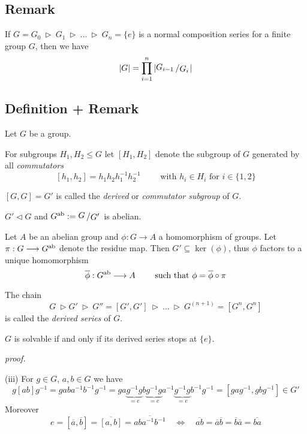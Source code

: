 \documentclass[12pt]{book}
\newcommand{\slant}[2]{{\raisebox{.1em}{$#1$}\left/\raisebox{-.1em}{$#2$}\right.}}
\begin{document}
\begin{spacing}{1.3}
\subsection{Remark} %
If $G=G_0 \ \triangleright \ G_1 \ \triangleright \ \ldots \ \triangleright \ G_n= \{e\}$ is a normal composition series for a finite group $G$, then we have
$$\vert G \vert = \prod_{i=1}^{n} \vert \slant{G_{i-1}}{G_i} \vert $$

\pagebreak

\subsection{Definition + Remark} %
Let $G$ be a group.
\begin{compactenum}
\item For subgroups $H_1, H_2 \leqslant G$ let $[H_1, H_2]$ denote the subgroup of $G$ generated by all \textit{commutators}
$$[h_1, h_2]=h_1h_2 h_1^{-1}h_2^{-1}\qquad \textrm { with } h_i \in H_i \textrm{  for } i \in \{1,2\}$$
\item $[G,G]=G'$ is called the \textit{derived} or \textit{commutator subgroup} of $G$.
\item $G' \triangleleft G$ and $G^{\rm{ab}}:=\slant{G}{G'}$ is abelian.
\item Let $A$ be an abelian group and $\phi:G \longrightarrow A$ a homomorphism of groups. Let $\pi: G \longrightarrow G^{\rm{ab}}$ denote the residue map. Then $G' \subseteq \ker(\phi)$, thus $\phi$ factors to a unique homomorphism
$$\overline{\phi}: G^{\rm{ab}} \longrightarrow A \qquad \textrm{ such that } \phi= \overline{\phi} \circ \pi$$
\item The chain 
$$G \ \triangleright G' \ \triangleright \ G''=[G', G'] \ \triangleright \ \ldots \ \triangleright \ G^{(n+1)}=[G^n, G^n]$$
is called the \textit{derived series} of $G$.
\item $G$ is solvable if and only if its derived series stops at $\{e\}$.
\end{compactenum}
\textit{proof.}
\begin{compactenum}
\item[(iii)] For $g \in G$, $a,b \in G$ we have
$$g [ab]g^{-1}=gaba^{-1}b^{-1}g^{-1}=ga\underbrace{g^{-1}g}_{=e}b\underbrace{g^{-1}g}_{=e}a^{-1}\underbrace{g^{-1}g}_{=e}b^{-1}g^{-1}=[gag^{-1}, gbg^{-1}] \in G'$$
Moreover
$$e=[\overline{a}, \overline{b}]=\overline{[a,b]}=\overline{aba^{-1}b^{-1}} \quad \Longleftrightarrow \quad \overline{ab}=\overline{a}\overline{b}=\overline{b}\overline{a}=\overline{ba}$$

\end{compactenum}
\end{spacing}
\end{document}
